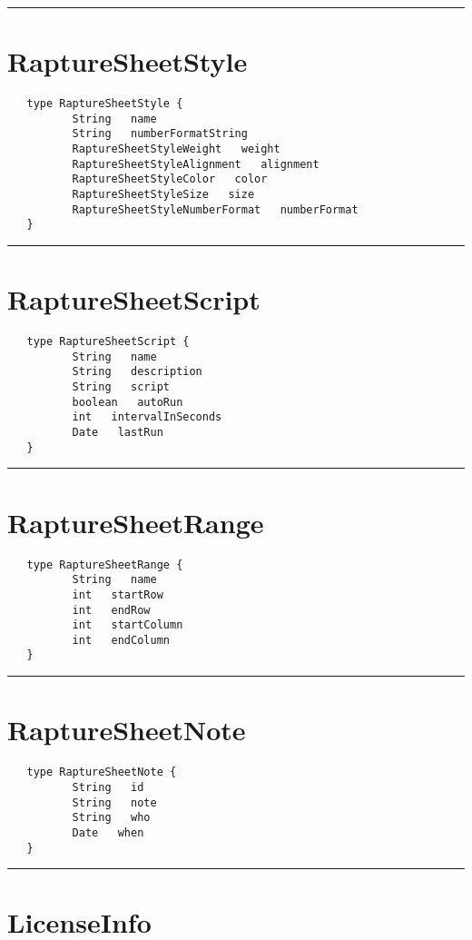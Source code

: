 \rule{15cm}{2pt}
\section{RaptureSheetStyle}
\label{type:RaptureSheetStyle}

\begin{verbatim}
   type RaptureSheetStyle {
          String   name
          String   numberFormatString
          RaptureSheetStyleWeight   weight
          RaptureSheetStyleAlignment   alignment
          RaptureSheetStyleColor   color
          RaptureSheetStyleSize   size
          RaptureSheetStyleNumberFormat   numberFormat
   }
\end{verbatim}

\rule{15cm}{2pt}
\section{RaptureSheetScript}
\label{type:RaptureSheetScript}

\begin{verbatim}
   type RaptureSheetScript {
          String   name
          String   description
          String   script
          boolean   autoRun
          int   intervalInSeconds
          Date   lastRun
   }
\end{verbatim}

\rule{15cm}{2pt}
\section{RaptureSheetRange}
\label{type:RaptureSheetRange}

\begin{verbatim}
   type RaptureSheetRange {
          String   name
          int   startRow
          int   endRow
          int   startColumn
          int   endColumn
   }
\end{verbatim}

\rule{15cm}{2pt}
\section{RaptureSheetNote}
\label{type:RaptureSheetNote}

\begin{verbatim}
   type RaptureSheetNote {
          String   id
          String   note
          String   who
          Date   when
   }
\end{verbatim}

\rule{15cm}{2pt}
\section{LicenseInfo}
\label{type:LicenseInfo}

